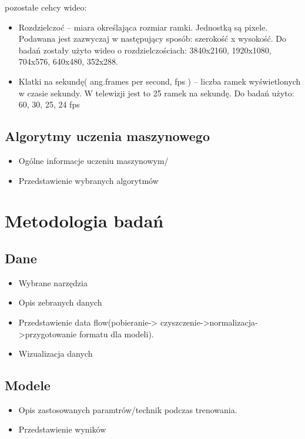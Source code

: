 pozostałe cehcy wideo: 

\begin{itemize}[label=$\bullet$]
\item Rozdzielczoć -- miara określająca rozmiar ramki. Jednostką są pixele. Podawana jest zazwyczaj w następujący sposób: szerokość x wysokość. Do badań zostały użyto wideo o rozdzielczościach: 3840x2160, 1920x1080, 704x576, 640x480, 352x288. 
\item Klatki na sekundę( ang.frames per second, fps ) -- liczba ramek wyświetlonych w czasie sekundy. W telewizji jest to 25 ramek na sekundę. Do badań użyto: 60, 30, 25, 24 fps
\end{itemize}

\section{Algorytmy uczenia maszynowego }
\label{cha:pierwszyDokument}

\begin{itemize}
\item Ogólne informacje uczeniu maszynowym/
\item Przedstawienie wybranych algorytmów 
\end{itemize}

\chapter{Metodologia badań}
\label{cha:pierwszyDokument}

\section{Dane}
\label{cha:pierwszyDokument}

\begin{itemize}
\item Wybrane narzędzia
\item Opis zebranych danych
\item Przedstawienie data flow(pobieranie-> czyszczenie->normalizacja->przygotowanie formatu dla modeli).
\item Wizualizacja danych
\end{itemize}


\section{Modele }
\label{cha:pierwszyDokument}

\begin{itemize}
\item Opis zastosowanych paramtrów/technik podczas trenowania.
\item Przedstawienie wyników 
\end{itemize}


